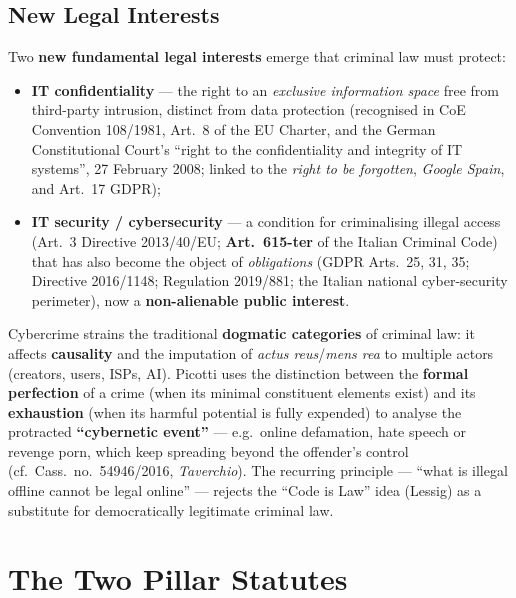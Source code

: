\documentclass[11pt,a4paper,openany]{report}
\theoremstyle{definition}
\theoremstyle{plain}
\theoremstyle{remark}
\begin{document}
\subsection{New Legal Interests}

Two \textbf{new fundamental legal interests} emerge that criminal law must protect:
\begin{itemize}
    \item \textbf{IT confidentiality} --- the right to an \emph{exclusive information space} free from third-party intrusion, distinct from data protection (recognised in CoE Convention 108/1981, Art.\ 8 of the EU Charter, and the German Constitutional Court's ``right to the confidentiality and integrity of IT systems'', 27 February 2008; linked to the \emph{right to be forgotten}, \textit{Google Spain}, and Art.\ 17 GDPR);
    \item \textbf{IT security / cybersecurity} --- a condition for criminalising illegal access (Art.\ 3 Directive 2013/40/EU; \textbf{Art.\ 615-ter} of the Italian Criminal Code) that has also become the object of \emph{obligations} (GDPR Arts.\ 25, 31, 35; Directive 2016/1148; Regulation 2019/881; the Italian national cyber-security perimeter), now a \textbf{non-alienable public interest}.
\end{itemize}

\begin{keypoint}
Cybercrime strains the traditional \textbf{dogmatic categories} of criminal law: it affects \textbf{causality} and the imputation of \emph{actus reus}/\emph{mens rea} to multiple actors (creators, users, ISPs, AI). Picotti uses the distinction between the \textbf{formal perfection} of a crime (when its minimal constituent elements exist) and its \textbf{exhaustion} (when its harmful potential is fully expended) to analyse the protracted \textbf{``cybernetic event''} --- e.g.\ online defamation, hate speech or revenge porn, which keep spreading beyond the offender's control (cf.\ Cass.\ no.\ 54946/2016, \emph{Taverchio}). The recurring principle --- ``what is illegal offline cannot be legal online'' --- rejects the ``Code is Law'' idea (Lessig) as a substitute for democratically legitimate criminal law.
\end{keypoint}

\section{The Two Pillar Statutes}
\end{document}

